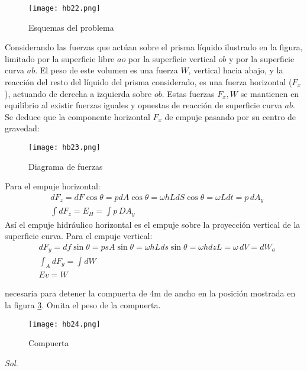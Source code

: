 \begin{figure}[h!]
\centering
  \texttt{[image: hb22.png]}
  \caption{Esquemas del problema}
  \label{hb22}
\end{figure}

Considerando las fuerzas que actúan sobre el prisma líquido ilustrado en la figura, limitado por la superficie libre $ao$ por la superficie vertical $ob$ y por la superficie curva $ab$. El peso de este volumen es una fuerza $W$, vertical hacia abajo, y la reacción del resto del líquido del prisma considerado, es una fuerza horizontal ($F_x$), actuando de derecha a izquierda sobre $ob$.
Estas fuerzas $F_x,W$ se mantienen en equilibrio al existir fuerzas iguales y opuestas de reacción de superficie curva $ab$. Se deduce que la componente horizontal $F_x$ de empuje pasando por su centro de gravedad: 
\begin{figure}[h!]
    \centering
      \texttt{[image: hb23.png]}
      \caption{Diagrama de fuerzas}
      \label{hb23}
    \end{figure}
Para el empuje horizontal: 
\begin{align*}
    &dF_z=dF\cos\theta=pdA\cos\theta=\omega hLdS\cos\theta=\omega Ldt=p\, dA_y\\ 
    &\int dF_z=E_H=\int p\, DA_y
\end{align*}
Así el empuje hidráulico horizontal es el empuje sobre la proyección vertical de la superficie curva. Para el empuje vertical:
\begin{align*}
    &dF_y=df\sin\theta=psA\sin\theta=\omega hLds\sin\theta=\omega hdzL=\omega\,dV=dW_a\\
    &\int_A dF_y=\int dW\\
    &Ev=W
\end{align*}

\begin{problem}
    necesaria para detener la compuerta de 4m de ancho en la posición mostrada en la figura \ref{hb24}. Omita el peso de la compuerta.
\end{problem}
\begin{figure}[h!]
\centering
  \texttt{[image: hb24.png]}
  \caption{Compuerta}
  \label{hb24}
\end{figure}

\textit{ Sol. }

